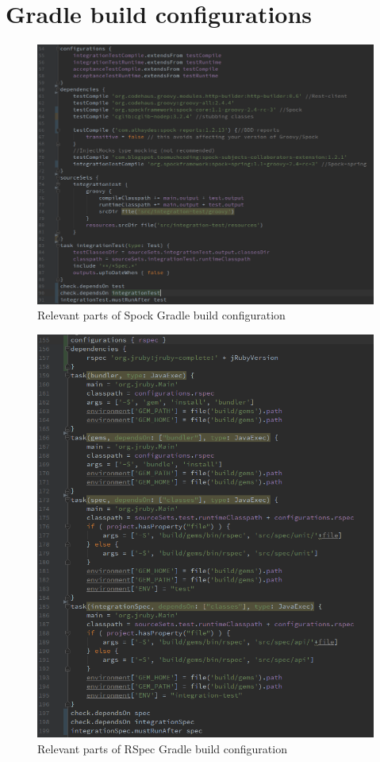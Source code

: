 \chapter{Gradle build configurations}
\label{chapter:gradle-build}

\begin{figure}[ht]
  \begin{center}
    \includegraphics[width=13.7cm]{images/spock-gradle.png}
    \caption{Relevant parts of Spock Gradle build configuration}
    \label{fig:spock-build}
  \end{center}
\end{figure}

\begin{figure}[ht]
  \begin{center}
    \includegraphics[width=13.7cm]{images/rspec-build.png}
    \caption{Relevant parts of RSpec Gradle build configuration}
    \label{fig:rspec-build}
  \end{center}
\end{figure}


